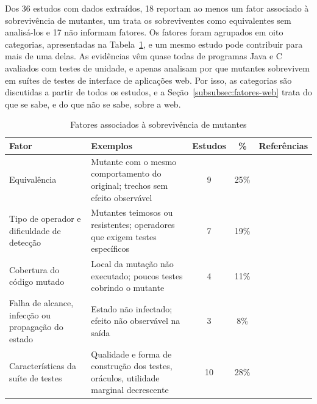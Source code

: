 Dos 36 estudos com dados extraídos, 18 reportam ao menos um fator associado à sobrevivência de mutantes, um trata os sobreviventes como equivalentes sem analisá-los \cite{khanfir2023} e 17 não informam fatores. Os fatores foram agrupados em oito categorias, apresentadas na Tabela~\ref{tab:fatores-sobrevivencia}, e um mesmo estudo pode contribuir para mais de uma delas. As evidências vêm quase todas de programas Java e C avaliados com testes de unidade, e apenas  analisam por que mutantes sobrevivem em suítes de testes de interface de aplicações web. Por isso, as categorias são discutidas a partir de todos os estudos, e a Seção~\ref{subsubsec:fatores-web} trata do que se sabe, e do que não se sabe, sobre a web.

\begin{table}[H]
    \centering
    \footnotesize
    \caption{Fatores associados à sobrevivência de mutantes}
    \label{tab:fatores-sobrevivencia}
    \begin{tabular}{|p{3.0cm}|p{3.8cm}|c|c|p{4.3cm}|}
        \hline
        \textbf{Fator} & \textbf{Exemplos} & \textbf{Estudos} & \textbf{\%} & \textbf{Referências} \\
        \hline
        Equivalência & Mutante com o mesmo comportamento do original; trechos sem efeito observável & 9 & 25\% & \cite{zhang2019, belli2011, tao2025, yandrapally2021, he2024, just2014, yao2014, assylbekov2013, inozemtseva2013} \\
        \hline
        Tipo de operador e dificuldade de detecção & Mutantes teimosos ou resistentes; operadores que exigem testes específicos & 7 & 19\% & \cite{esterobotaro2010, belli2011, lin2018, yao2014, zhang2019, tao2025, yandrapally2021} \\
        \hline
        Cobertura do código mutado & Local da mutação não executado; poucos testes cobrindo o mutante & 4 & 11\% & \cite{just2014, zhang2019, grano2019, zhang2022} \\
        \hline
        Falha de alcance, infecção ou propagação do estado & Estado não infectado; efeito não observável na saída & 3 & 8\% & \cite{yao2014, lin2018, zhang2019} \\
        \hline
        Características da suíte de testes & Qualidade e forma de construção dos testes, oráculos, utilidade marginal decrescente & 10 & 28\% & \cite{esterobotaro2010, assylbekov2013, inozemtseva2013, alenezi2016, lin2018, grano2019, petrovic2021, yandrapally2021, zhang2022, ashong2026} \\
        \hline

\end{tabular}
\end{table}
